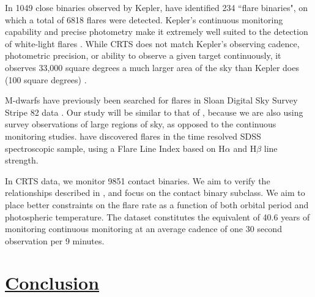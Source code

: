 \documentclass[12pt]{article} %
\numberwithin{equation}{section} %
\begin{document}
In 1049 close binaries observed by Kepler, \citet{gao2016white} have identified 234 ``flare binaries", on which a total of 6818 flares were detected. Kepler's continuous monitoring capability and precise photometry make it extremely well suited to the detection of white-light flares \citep{walkowicz2011white}. While CRTS does not match Kepler's observing cadence, photometric precision, or ability to observe a given target continuously, it observes 33,000 square degrees a much larger area of the sky than Kepler does (100 square degrees) \citep{drake2009first, basri2005kepler}.

M-dwarfs have previously been searched for flares in Sloan Digital Sky Survey Stripe 82 data \citep{kowalski2009m}. Our study will be similar to that of \citet{kowalski2009m}, because we are also using survey observations of large regions of sky, as opposed to the continuous monitoring studies. \citet{hilton2010m} have discovered flares in the time resolved SDSS spectroscopic sample, using a Flare Line Index based on H$\alpha$ and H$\beta$ line strength.

In CRTS data, we monitor 9851 contact binaries. We aim to verify the relationships described in \citet{gao2016white}, and focus on the contact binary subclass.
We aim to place better constraints on the flare rate as a function of both orbital period and photospheric temperature. The dataset constitutes the equivalent of 40.6 years of monitoring continuous monitoring at an average cadence of one 30 second observation per 9 minutes. 








\section[Conclusion]{\hyperlink{toc}{Conclusion}}
\end{document}
